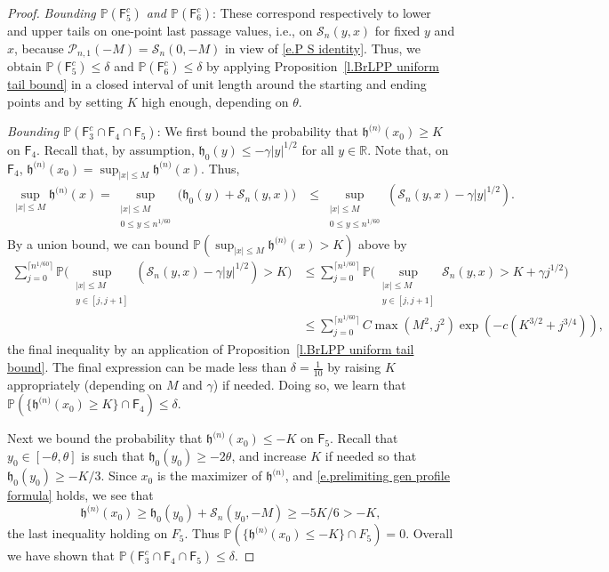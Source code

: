 \documentclass[oneside,final,11pt]{amsart}
\theoremstyle{definition}
\newcounter{assum}
\renewcommand{\L}{\CP}
\newcommand{\fh}{\mathfrak{h}}
\newcommand{\h}{\fh^{{\scriptscriptstyle(}n{\scriptscriptstyle)}}}
\newcommand{\R}{\mathbb{R}}
\newcommand{\CS}{\mathcal{S}}
\renewcommand{\S}{\CS}
\newcommand{\1}[1]{\mathbf{1}_{#1}}
\newcommand{\hlim}{\mathfrak{h}}
\newcommand{\msf}{\mathsf}
\newcommand{\CP}{\mathcal{P}}
\renewcommand{\P}{\mathbb P}
\numberwithin{equation}{section}
\begin{document}
\begin{proof}
\noindent\emph{Bounding $\P(\msf F_5^c)$ and $\P(\msf F_6^c)$}: These correspond respectively to lower and upper tails on one-point last passage values, i.e., on $\S_n(y,x)$ for fixed $y$ and $x$, because $\L_{n,1}(-M) = \S_n(0, -M)$ in view of \eqref{e.P S identity}. Thus, we obtain $\P(\msf F_5^c) \leq \delta$ and $\P(\msf F_6^c) \leq \delta$ by applying Proposition~\ref{l.BrLPP uniform tail bound} in a closed interval of unit length around the starting and ending points and by setting $K$ high enough, depending on $\theta$.
\medskip

\noindent\emph{Bounding $\P(\msf F_3^c\cap \msf F_4 \cap \msf F_5)$}: We first bound the probability that $\h(x_0) \geq K$ on $\msf F_4$. Recall that, by assumption, $ \hlim_0(y) \leq - \gamma |y|^{1/2}$ for all $y\in \R$. %
Note that, on $\msf F_4$,
%
$\h(x_0) = \sup_{|x|\leq M} \h(x).$
%
Thus,
%
\begin{align*}
\sup_{|x|\leq M}\h(x)
%
= \sup_{\substack{|x|\leq M\\ 0\leq y \leq n^{1/60}}}\Big(\hlim_0(y) + \S_n(y, x)\Big)
%
&\leq \sup_{\substack{|x|\leq M\\ 0\leq y \leq n^{1/60}}} \left(\S_n(y,x) - \gamma |y|^{1/2}\right).
\end{align*}
%
By a union bound, we can bound $\P\left(\sup_{|x|\leq M} \h(x) > K\right)$ above by
%
\begin{align*}
\sum_{j=0}^{\lceil n^{1/60}\rceil } \P\Bigg(\sup_{\substack{|x|\leq M\\ y \in[j,j+1]}} \left(\S_n(y,x) - \gamma |y|^{1/2}\right) > K\Bigg) 
%
&\leq \sum_{j=0}^{\lceil n^{1/60}\rceil } \P\Bigg(\sup_{\substack{|x|\leq M\\ y \in[j,j+1]}} \S_n(y,x) > K + \gamma j^{1/2}\Bigg)\\
%
&\leq \sum_{j=0}^{\lceil n^{1/60}\rceil } C\max(M^2, j^2) \exp\left(-c(K^{3/2} + j^{3/4})\right),
\end{align*}
%
the final inequality by an application of Proposition~\ref{l.BrLPP uniform tail bound}. The final expression can be made less than $\delta=\frac{1}{10}$ by raising $K$ appropriately (depending on $M$ and $\gamma$) if needed. Doing so, we learn that $\P(\{\h(x_0)\geq K\}\cap \msf F_4) \leq \delta$.

Next we bound the probability that $\h(x_0) \leq -K$ on $\msf F_5$.  Recall that $y_0\in [-\theta,\theta]$ is such that $\fh_0(y_0) \geq -2\theta$, and increase $K$ if needed so that $\fh_0(y_0) \geq -K/3$. Since $x_0$ is the maximizer of $\h$, and  \eqref{e.prelimiting gen profile formula} holds, we see that
%
$$\h(x_0) \geq \fh_0(y_0) + \S_n(y_0, -M) \geq -5K/6 > -K,$$
%
the last inequality holding on $F_5$. Thus $\P(\{\h(x_0) \leq -K\}\cap F_5) = 0$. Overall we have shown that $\P(\msf F_3^c \cap \msf F_4\cap \msf F_5) \leq \delta$.


\end{proof}
\end{document}
